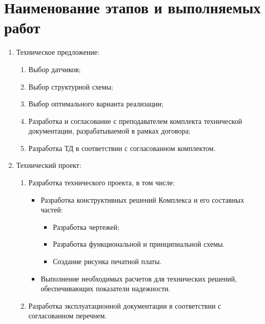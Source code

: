 	\section{Наименование этапов и выполняемых работ}
		\begin{enumerate}
\changefontsizes[14pt]{14pt}
			\item Техническое предложение:
				\begin{enumerate}
\changefontsizes[14pt]{14pt}
					\item Выбор датчиков;
					\item Выбор структурной схемы;
					\item Выбор оптимального варианта реализации;
					\item Разработка и согласование с преподавателем комплекта технической документации, разрабатываемой в рамках договора;
					\item Разработка ТД в соответствии с согласованном комплектом.
				\end{enumerate}
			\item Технический проект:
				\begin{enumerate}
\changefontsizes[14pt]{14pt}
					\item Разработка технического проекта, в том числе:
						\begin{itemize}
				\changefontsizes[14pt]{14pt}
							\item Разработка конструктивных решений Комплекса и его составных частей:
								\begin{itemize}
				\changefontsizes[14pt]{14pt}
									\item Разработка чертежей;
									\item Разработка функциональной и принципиальной схемы.
									\item Создание рисунка печатной платы.
								\end{itemize}
							\item Выполнение необходимых расчетов для технических решений, обеспечивающих показатели надежности.
						\end{itemize}
					\item Разработка эксплуатационной документации в соответствии с согласованном перечнем.
				\end{enumerate}
		\end{enumerate}
